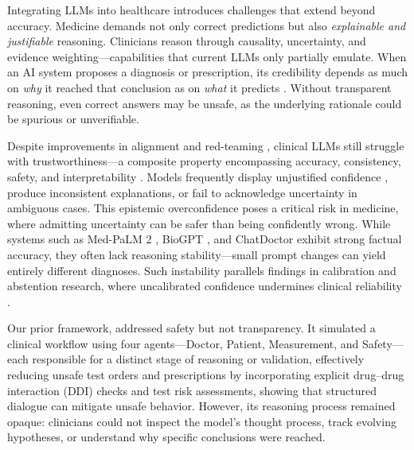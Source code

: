 \documentclass[letterpaper]{article} %
\begin{document}
Integrating LLMs into healthcare introduces challenges that extend beyond accuracy. Medicine demands not only correct predictions but also \emph{explainable and justifiable} reasoning. Clinicians reason through causality, uncertainty, and evidence weighting—capabilities that current LLMs only partially emulate. When an AI system proposes a diagnosis or prescription, its credibility depends as much on \emph{why} it reached that conclusion as on \emph{what} it predicts \cite{tonekaboni2019clinicians,amann2020explainability}. Without transparent reasoning, even correct answers may be unsafe, as the underlying rationale could be spurious or unverifiable.

Despite improvements in alignment and red-teaming \cite{mei2023assert}, clinical LLMs still struggle with trustworthiness—a composite property encompassing accuracy, consistency, safety, and interpretability \cite{a2019,huang2025survey}. Models frequently display unjustified confidence \cite{kadavath2022language}, produce inconsistent explanations, or fail to acknowledge uncertainty in ambiguous cases. This epistemic overconfidence poses a critical risk in medicine, where admitting uncertainty can be safer than being confidently wrong. While systems such as Med-PaLM 2 \cite{singhal2025toward}, BioGPT \cite{luo2022biogpt}, and ChatDoctor \cite{li2023chatdoctor} exhibit strong factual accuracy, they often lack reasoning stability—small prompt changes can yield entirely different diagnoses. Such instability parallels findings in calibration and abstention research, where uncalibrated confidence undermines clinical reliability \cite{guo2017calibration,malinin2020uncertainty}.


Our prior framework, addressed safety but not transparency. It simulated a clinical workflow using four agents—Doctor, Patient, Measurement, and Safety—each responsible for a distinct stage of reasoning or validation, effectively reducing unsafe test orders and prescriptions by incorporating explicit drug–drug interaction (DDI) checks and test risk assessments, showing that structured dialogue can mitigate unsafe behavior. However, its reasoning process remained opaque: clinicians could not inspect the model’s thought process, track evolving hypotheses, or understand why specific conclusions were reached.
\end{document}
